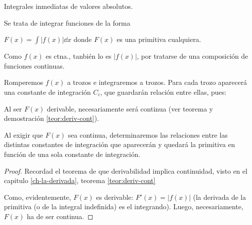 \begin{teor}{Integrales inmediatas de valores absolutos.}

Se trata de integrar funciones de la forma 

$F(x)= \int |f(x)| \dd x$ donde $F(x)$ es una primitiva cualquiera. 

Como $f(x)$ es ctna., tanbién lo es $|f(x)|$, por tratarse de una composición de funciones continuas.

Romperemos $f(x)$ a trozos e integraremos a trozos. Para cada trozo aparecerá una constante de integración $C_i$, que guardarán relación entre ellas, pues:

Al ser $F(x)$ derivable, necesariamente será continua (ver teorema y demostración \ref{teor:deriv-cont}). 

Al exigir que $F(x)$ sea continua, determinaremos las relaciones entre las distintas constantes de integración que aparecerán y quedará la primitiva en función de una sola constante de integración.
\end{teor}

\begin{proof}
Recordad el teorema de que derivabilidad implica continuidad, visto en el capitulo \ref{ch-la-derivada}, teorema \ref{teor:deriv-cont}

Como, evidentemente, $F(x)$ es derivable: $F'(x)=|f(x)|$	 (la derivada de la primitiva (o de la integral indefinida) es el integrando). Luego, necesariamente, $F(x)$ ha de ser continua.
\end{proof}


